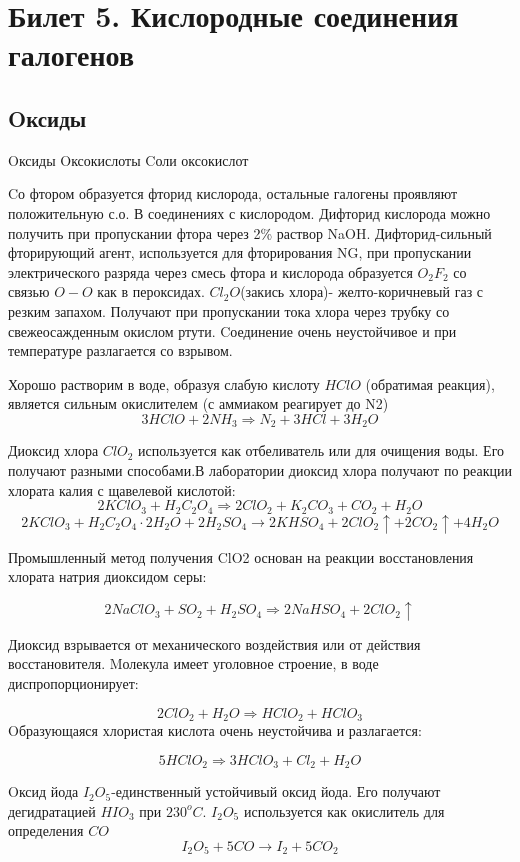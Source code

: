 \documentclass[11pt]{article}
\begin{document}
\section{Билет 5. Кислородные соединения галогенов}

\subsection{Oксиды}Oксиды Oксокислоты Cоли оксокислот

Cо фтором образуется фторид кислорода, остальные галогены проявляют
положительную с.о. В соединениях с кислородом. Дифторид кислорода можно
получить при пропускании фтора через 2\% раствор NaOH. Дифторид-сильный
фторирующий агент, используется для фторирования NG, при пропускании
электрического разряда через смесь фтора и кислорода образуется $O_2F_2$ со
связью $O-O$ как в пероксидах.
$Cl_2O$(закись хлора)- желто-коричневый газ с резким запахом. Получают при
пропускании тока хлора через трубку со свежеосажденным окислом ртути.
Cоединение очень неустойчивое и при температуре разлагается со взрывом.

Хорошо растворим в воде, образуя слабую кислоту $HClO$ (обратимая реакция),
является сильным окислителем (с аммиаком реагирует до N2)
$$3HClO+2NH_3 \Rightarrow N_2+3HCl+3H_2O$$

Диоксид хлора $ClO_2$ используется как отбеливатель или для очищения
воды. Его получают разными способами.В лаборатории диоксид хлора получают по реакции хлората калия с щавелевой кислотой:
$$2KClO_{3}+H_{2}C_{2}O_{4}\Rightarrow 2ClO_{2}+K_{2}CO_{3}+CO_{2}+H_{2}O$$
$$2KClO_{3}+H_{2}C_{2}O_{4}\cdot 2H_{2}O+2H_{2}SO_{4}\rightarrow 2KHSO_{4}+2ClO_{2}\uparrow +2CO_{2}\uparrow +4H_{2}O$$

Промышленный метод получения ClO2 основан на реакции восстановления хлората натрия диоксидом серы:

$$2NaClO_{3}+SO_{2}+H_{2}SO_{4} \Rightarrow 2NaHSO_{4}+2ClO_{2}\uparrow$$


Диоксид взрывается от механического воздействия или от действия
восстановителя. Mолекула имеет уголовное строение, в воде
диспропорционирует:

$$2ClO_{2}+H_{2}O\Rightarrow HClO_{2}+HClO_{3}$$
Oбразующаяся хлористая кислота очень неустойчива и разлагается:

$$5HClO_{2}\Rightarrow 3HClO_{3}+Cl_{2}+H_{2}O$$

Oксид йода $I_2O_5$-единственный устойчивый оксид йода. Его получают
дегидратацией $HIO_3$ при $230^o C$. $I_2O_5$ используется как окислитель для определения
$CO$
$$I_{2}O_{5}+5CO \rightarrow I_{2}+5CO_{2}$$
\end{document}
